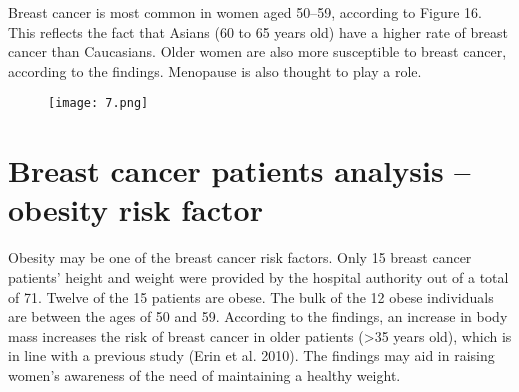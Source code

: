 \documentclass[10pt,a4paper,twoside]{article}
\begin{document}
Breast cancer is most common in women aged 50–59, according to Figure 16. This reflects the fact that Asians (60 to 65 years old) have a higher rate of breast cancer than Caucasians.
Older women are also more susceptible to breast cancer, according to the findings. Menopause is also thought to play a role.

\begin{figure}
  \texttt{[image: 7.png]}
  
  
  
\end{figure}
\section{Breast cancer patients analysis – obesity risk factor}

Obesity may be one of the breast cancer risk factors.
Only 15 breast cancer patients' height and weight were provided by the hospital authority out of a total of 71. Twelve of the 15 patients are obese. The bulk of the 12 obese individuals are between the ages of 50 and 59. According to the findings, an increase in body mass increases the risk of breast cancer in older patients (>35 years old), which is in line with a previous study (Erin et al. 2010). The findings may aid in raising women's awareness of the need of maintaining a healthy weight.
\end{document}
